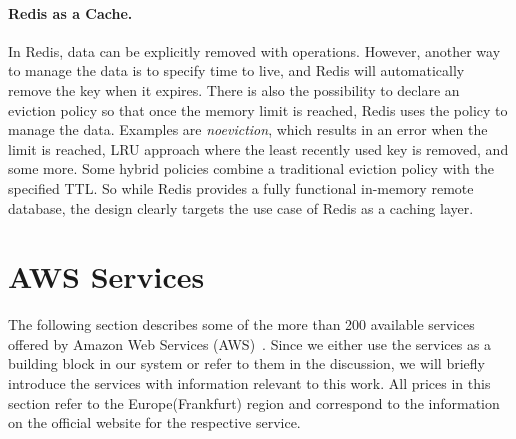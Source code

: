 \paragraph{Redis as a Cache.} In Redis, data can be explicitly removed with  operations. However, another way to manage the data is to specify time to live, and Redis will automatically remove the key when it expires. There is also the possibility to declare an eviction policy so that once the memory limit is reached, Redis uses the policy to manage the data. Examples are \emph{noeviction}, which results in an error when the limit is reached, LRU approach where the least recently used key is removed, and some more. Some hybrid policies combine a traditional eviction policy with the specified TTL. So while Redis provides a fully functional in-memory remote database, the design clearly targets the use case of Redis as a caching layer.




\section{AWS Services}
\label{sec:aws_services}
The following section describes some of the more than 200 available services offered by Amazon Web Services (AWS)~\cite{noauthor_cloud_nodate}. Since we either use the services as a building block in our system or refer to them in the discussion, we will briefly introduce the services with information relevant to this work. All prices in this section refer to the Europe(Frankfurt) region and correspond to the information on the official website for the respective service.


